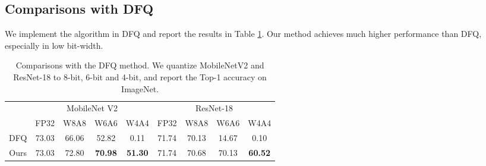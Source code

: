 \documentclass[runningheads]{llncs}
\begin{document}
\subsection{Comparisons with DFQ}

We implement the algorithm in DFQ \cite{nagel2019data} and report the results in Table \ref{tb:comparison_dfq}. Our method achieves much higher performance than DFQ, especially in low bit-width. 


\begin{table}[h]
\renewcommand\arraystretch{1.1}
\renewcommand{\tabcolsep}{5.0pt}
\begin{center}
\caption{Comparisons with the DFQ method. We quantize MobileNetV2 and ResNet-18 to 8-bit, 6-bit and 4-bit, and report the Top-1 accuracy on ImageNet.}
\label{tb:comparison_dfq}
\begin{tabular}{c|cccc|cccc}
\hline
     & \multicolumn{4}{c|}{MobileNet V2}               & \multicolumn{4}{c}{ResNet-18}          \\ \cline{2-9} 
     & FP32  & W8A8  & W6A6           & W4A4           & FP32  & W8A8  & W6A6  & W4A4           \\ \hline
DFQ  & 73.03 & 66.06 & 52.82          & 0.11           & 71.74 & 70.13 & 14.67 & 0.10           \\
Ours & 73.03 & 72.80 & \textbf{70.98} & \textbf{51.30} & 71.74 & 70.68 & 70.13 & \textbf{60.52} \\ \hline
\end{tabular}
\end{center}
\end{table}


\nocite{langley00}



\end{document}
